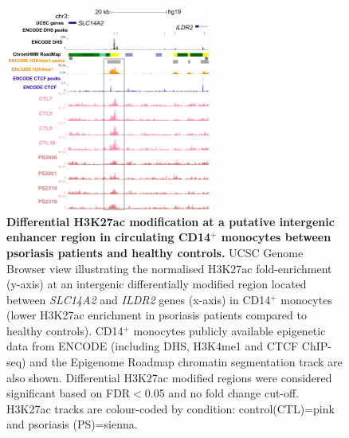 \begin{figure}[htbp]
\centering
\includegraphics[width=0.6\textwidth]{./Results2/pdfs/ChIPm_H3K27ac_UCSC_CD14_ILDR1_track}
\caption[Differential H3K27ac modification at a putative intergenic enhancer region in circulating CD14$^+$ monocytes between psoriasis patients and healthy controls.]{\textbf{Differential H3K27ac modification at a putative intergenic enhancer region in circulating CD14$^+$ monocytes between psoriasis patients and healthy controls.} UCSC Genome Browser view illustrating the normalised H3K27ac fold-enrichment (y-axis) at an intergenic differentially modified region located between \textit{SLC14A2} and \textit{ILDR2} genes (x-axis) in CD14$^+$ monocytes (lower H3K27ac enrichment in psoriasis patients compared to healthy controls). CD14$^+$ monocytes publicly available epigenetic data from ENCODE (including DHS, H3K4me1 and CTCF ChIP-seq) and the Epigenome Roadmap chromatin segmentation track are also shown. Differential H3K27ac modified regions were considered significant based on FDR$<$0.05 and no fold change cut-off. H3K27ac tracks are colour-coded by condition: control(CTL)=pink and psoriasis (PS)=sienna.}
\label{figure:ChIPm_H3K27ac_UCSC_ILDR1_track}
\end{figure}



